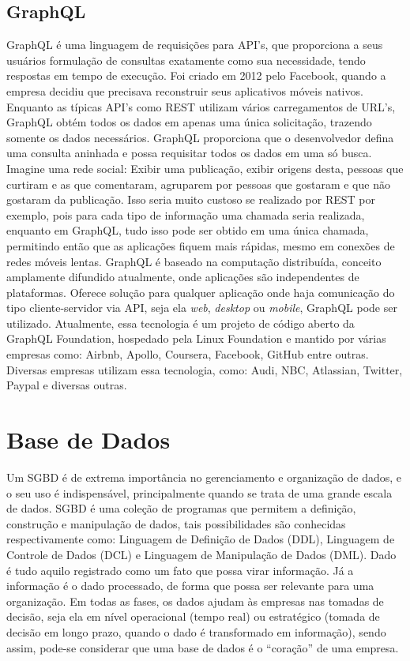 \subsection{GraphQL}
GraphQL é uma linguagem de requisições para API’s, que proporciona a seus usuários formulação de consultas exatamente como sua necessidade, tendo respostas em tempo de execução.
Foi criado em 2012 pelo Facebook, quando a empresa decidiu que precisava reconstruir seus aplicativos móveis nativos.
Enquanto as típicas API’s como REST utilizam vários carregamentos de URL’s, GraphQL obtém todos os dados em apenas uma única solicitação, trazendo somente os dados necessários. GraphQL proporciona que o desenvolvedor defina uma consulta aninhada e possa requisitar todos os dados em uma só busca.
Imagine uma rede social: Exibir uma publicação, exibir origens desta, pessoas que curtiram e as que comentaram, agruparem por pessoas que gostaram e que não gostaram da publicação. Isso seria muito custoso se realizado por REST por exemplo, pois para cada tipo de informação uma chamada seria realizada, enquanto em GraphQL, tudo isso pode ser obtido em uma única chamada, permitindo então que as aplicações fiquem mais rápidas, mesmo em conexões de redes móveis lentas.
GraphQL é baseado na computação distribuída, conceito amplamente difundido atualmente, onde aplicações são independentes de plataformas. Oferece solução para qualquer aplicação onde haja comunicação do tipo cliente-servidor via API, seja ela \textit{web}, \textit{desktop} ou \textit{mobile}, GraphQL pode ser utilizado.
Atualmente, essa tecnologia é um projeto de código aberto da GraphQL Foundation, hospedado pela Linux Foundation e mantido por várias empresas como: Airbnb, Apollo, Coursera, Facebook, GitHub entre outras.
Diversas empresas utilizam essa tecnologia, como: Audi, NBC, Atlassian, Twitter, Paypal e diversas outras.
\cite{graphqlrevolucionaria}


\section{Base de Dados}
Um SGBD é de extrema importância no gerenciamento e organização de dados, e o seu uso é indispensável, principalmente quando se trata de uma grande escala de dados. SGBD é uma coleção de programas que permitem a definição, construção e manipulação de dados, tais possibilidades são conhecidas respectivamente como: Linguagem de Definição de Dados (DDL), Linguagem de Controle de Dados (DCL) e Linguagem de Manipulação de Dados (DML).
Dado é tudo aquilo registrado como um fato que possa virar informação. Já a informação é o dado processado, de forma que possa ser relevante para uma organização. Em todas as fases, os dados ajudam às empresas nas tomadas de decisão, seja ela em nível operacional (tempo real) ou estratégico (tomada de decisão em longo prazo, quando o dado é transformado em informação), sendo assim, pode-se considerar que uma base de dados é o “coração” de uma empresa.
\cite{projetobdr}

